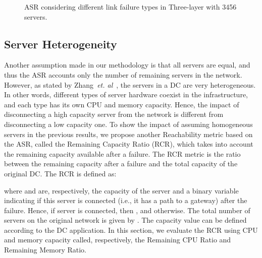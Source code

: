\begin{figure}[h!]
\centering
{}
\caption{ASR considering different link failure types in Three-layer with 3456 servers.}
\end{figure}
 
 
\subsection{Server Heterogeneity} 
\label{sec:hetServers}

Another assumption made in our methodology is that all servers are equal, and thus the ASR accounts only the number of remaining servers in the network. However, as stated by Zhang~\textit{et. al}~\cite{zhang2014Dynamic}, the servers in a DC are very heterogeneous. In other words, different types of server hardware coexist in the infrastructure, and each type has its own CPU and memory capacity. Hence, the impact of disconnecting a high capacity server from the network is different from disconnecting a low capacity one. To show the impact of assuming homogeneous servers in the previous results, we propose another Reachability metric based on the ASR, called the Remaining Capacity Ratio (RCR), which takes into account the remaining capacity available after a failure.
The RCR metric is the ratio between the remaining capacity after a failure and the total capacity of the original DC. The RCR is defined as:

where  and  are, respectively, the capacity of the server  and a binary variable indicating if this server is connected (i.e., it has a path to a gateway) after the failure. Hence, if server  is connected, then , and  otherwise. The total number of servers on the original network is given by . The capacity value can be defined according to the DC application. In this section, we evaluate the RCR using CPU and memory capacity called, respectively, the Remaining CPU Ratio and Remaining Memory Ratio.

